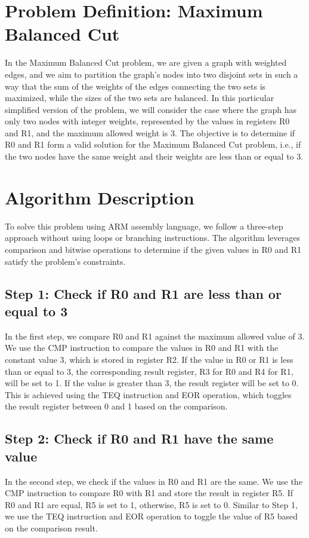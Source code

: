 \section{Problem Definition: Maximum Balanced Cut}
In the Maximum Balanced Cut problem, we are given a graph with weighted edges, and we aim to partition the graph's nodes into two disjoint sets in such a way that the sum of the weights of the edges connecting the two sets is maximized, while the sizes of the two sets are balanced. In this particular simplified version of the problem, we will consider the case where the graph has only two nodes with integer weights, represented by the values in registers R0 and R1, and the maximum allowed weight is 3. The objective is to determine if R0 and R1 form a valid solution for the Maximum Balanced Cut problem, i.e., if the two nodes have the same weight and their weights are less than or equal to 3.

\section{Algorithm Description}
To solve this problem using ARM assembly language, we follow a three-step approach without using loops or branching instructions. The algorithm leverages comparison and bitwise operations to determine if the given values in R0 and R1 satisfy the problem's constraints.

\subsection{Step 1: Check if R0 and R1 are less than or equal to 3}
In the first step, we compare R0 and R1 against the maximum allowed value of 3. We use the CMP instruction to compare the values in R0 and R1 with the constant value 3, which is stored in register R2. If the value in R0 or R1 is less than or equal to 3, the corresponding result register, R3 for R0 and R4 for R1, will be set to 1. If the value is greater than 3, the result register will be set to 0. This is achieved using the TEQ instruction and EOR operation, which toggles the result register between 0 and 1 based on the comparison.

\subsection{Step 2: Check if R0 and R1 have the same value}
In the second step, we check if the values in R0 and R1 are the same. We use the CMP instruction to compare R0 with R1 and store the result in register R5. If R0 and R1 are equal, R5 is set to 1, otherwise, R5 is set to 0. Similar to Step 1, we use the TEQ instruction and EOR operation to toggle the value of R5 based on the comparison result.

